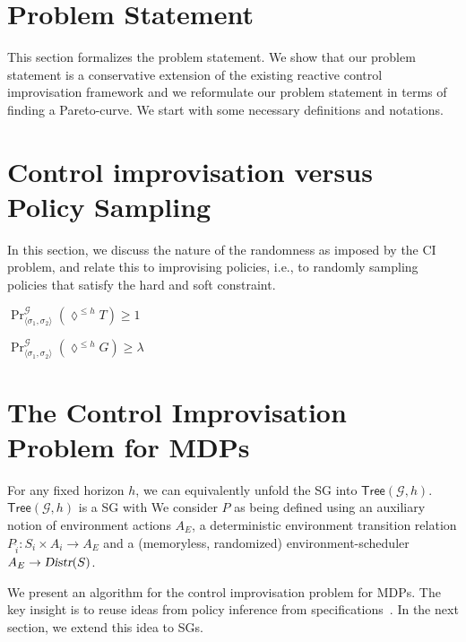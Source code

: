 \documentclass[conference]{IEEEtran}
\theoremstyle{remark}
\newcommand{\sg}{\mathcal{G}}
\newcommand{\eventually}[1]{\lozenge^{\leq #1}}
\newcommand{\sched}{\sigma}
\newcommand{\Distr}{\ensuremath{\textsl{Distr}}}
\newcommand{\Act}{A}
\newcommand{\unrolled}[2]{\textsf{Tree}(#1,#2)}
\begin{document}
\section{Problem Statement}
This section formalizes the problem statement. We show that our problem statement is a conservative extension of the existing reactive control improvisation framework and we reformulate our problem statement in terms of finding a Pareto-curve. We start with some necessary definitions and notations.



\section{Control improvisation versus Policy Sampling}
In this section, we discuss the nature of the randomness as imposed by the CI problem, and relate this to improvising policies, i.e., to randomly sampling policies that satisfy the hard and soft constraint.




\begin{mdframed}

\begin{compactenum}
	\item $\Pr^\sg_{\langle \sched_1,\sched_2 \rangle}(\eventually{h} T) \geq 1$
	\item $\Pr^\sg_{\langle \sched_1,\sched_2 \rangle}(\eventually{h} G) \geq \lambda$ 
\end{compactenum}
\end{mdframed}




\section{The Control Improvisation Problem for MDPs}
\color{black!50}
For any fixed horizon $h$, we can equivalently unfold the SG into  $\unrolled{\sg}{h}$. $\unrolled{\sg}{h}$ is a SG with 
We consider $P$ as being defined using an auxiliary notion of environment actions $\Act_E$, a deterministic environment transition relation $P_{\hat{i}}\colon S_i \times \Act_i \rightarrow A_E$ and a (memoryless, randomized) environment-scheduler $A_E \rightarrow \Distr(S)$.

\color{black}

We present an algorithm for the control improvisation problem for MDPs. The key insight is to reuse ideas from policy inference from specifications~\cite{DBLP:conf/cav/Vazquez-Chanlatte20}.
In the next section, we extend this idea to SGs. 
\end{document}
